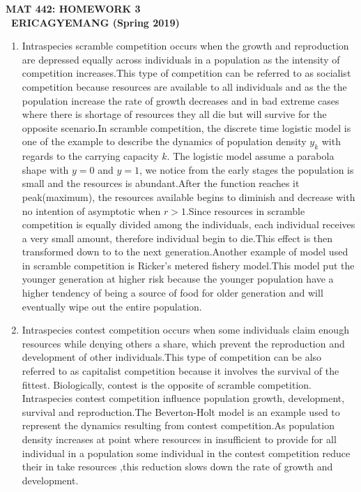 \documentclass[12pt]{article}
\begin{document}
\begin{center}
\textbf{ MAT 442: HOMEWORK 3}\\
\textbf{\ ERICAGYEMANG (Spring 2019)}\\
\end{center}

\begin{enumerate} 
\item Intraspecies scramble competition occurs when the growth and reproduction are depressed equally across individuals in a population as the intensity of competition increases.This type of competition can be referred to as socialist competition because resources are available to all individuals and as the the population increase the rate of growth decreases and in bad extreme cases where there is shortage of resources they all die but will survive for the opposite scenario.In scramble competition, the discrete time logistic model is one of the example to describe the dynamics of population density $y_k$ with regards to the carrying capacity $k$. The logistic model assume a parabola shape with $y=0$ and $y=1$, we notice from the early stages the population is small and the resources is abundant.After the function reaches it peak(maximum), the resources available begins to diminish and decrease with no intention of asymptotic when $r>1$.Since resources in scramble competition is equally divided among the individuals, each individual receives a very small amount, therefore individual begin to die.This effect is then transformed down to to the next generation.Another example of model used in scramble competition is Ricker's metered fishery model.This model put the younger generation at higher risk because the younger population have a higher tendency of being a source of food for older generation and will eventually wipe out the entire population.



\cleardoublepage 

\item Intraspecies contest competition occurs  when some individuals claim enough resources while denying others a share, which prevent the reproduction and development of other individuals.This type of competition can be also referred to as capitalist competition because it involves the survival of the fittest. Biologically, contest is the opposite of scramble competition. Intraspecies contest competition influence population growth, development, survival and reproduction.The Beverton-Holt model is an example used to represent the dynamics resulting from contest competition.As population density increases at point where resources in insufficient to provide for all individual in a population some individual in the contest competition reduce their in take resources ,this reduction slows down the rate of growth and development. 



\end{enumerate}
\end{document}
